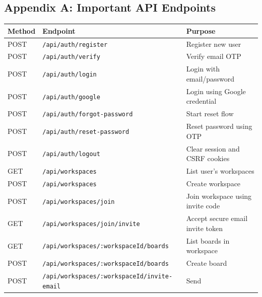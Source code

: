 \documentclass[
]{article}
\begin{document}
\subsection{Appendix A: Important API
Endpoints}\label{appendix-a-important-api-endpoints}

{\def\LTcaptype{} %
\begin{longtable}[]{@{}
  >{\raggedright\arraybackslash}p{}
  >{\raggedright\arraybackslash}p{}
  >{\raggedright\arraybackslash}p{}@{}}
\toprule\noalign{}
\begin{minipage}[b]{\linewidth}\raggedright
Method
\end{minipage} & \begin{minipage}[b]{\linewidth}\raggedright
Endpoint
\end{minipage} & \begin{minipage}[b]{\linewidth}\raggedright
Purpose
\end{minipage} \\
\midrule\noalign{}
\endhead
\bottomrule\noalign{}
\endlastfoot
POST & \texttt{/api/auth/register} & Register new user \\
POST & \texttt{/api/auth/verify} & Verify email OTP \\
POST & \texttt{/api/auth/login} & Login with email/password \\
POST & \texttt{/api/auth/google} & Login using Google credential \\
POST & \texttt{/api/auth/forgot-password} & Start reset flow \\
POST & \texttt{/api/auth/reset-password} & Reset password using OTP \\
POST & \texttt{/api/auth/logout} & Clear session and CSRF cookies \\
GET & \texttt{/api/workspaces} & List user's workspaces \\
POST & \texttt{/api/workspaces} & Create workspace \\
POST & \texttt{/api/workspaces/join} & Join workspace using invite
code \\
GET & \texttt{/api/workspaces/join/invite} & Accept secure email invite
token \\
GET & \texttt{/api/workspaces/:workspaceId/boards} & List boards in
workspace \\
POST & \texttt{/api/workspaces/:workspaceId/boards} & Create board \\
POST & \texttt{/api/workspaces/:workspaceId/invite-email} & Send

\end{longtable}}
\end{document}
